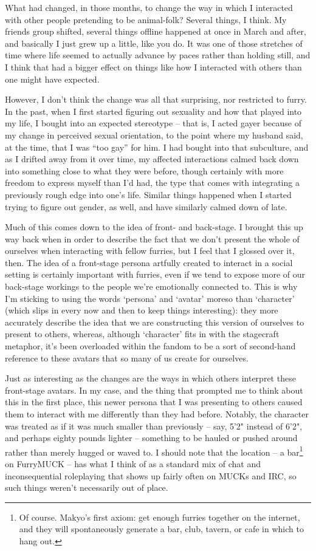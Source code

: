 What had changed, in those months, to change the way in which I interacted with other people pretending to be animal-folk?  Several things, I think.  My friends group shifted, several things offline happened at once in March and after, and basically I just grew up a little, like you do.  It was one of those stretches of time where life seemed to actually advance by paces rather than holding still, and I think that had a bigger effect on things like how I interacted with others than one might have expected.

However, I don't think the change was all that surprising, nor restricted to furry.  In the past, when I first started figuring out sexuality and how that played into my life, I bought into an expected stereotype -- that is, I acted gayer because of my change in perceived sexual orientation, to the point where my husband said, at the time, that I was ``too gay'' for him.  I had bought into that subculture, and as I drifted away from it over time, my affected interactions calmed back down into something close to what they were before, though certainly with more freedom to express myself than I'd had, the type that comes with integrating a previously rough edge into one's life.  Similar things happened when I started trying to figure out gender, as well, and have similarly calmed down of late.

Much of this comes down to the idea of front- and back-stage.  I brought this up way back when in order to describe the fact that we don't present the whole of ourselves when interacting with fellow furries, but I feel that I glossed over it, then.  The idea of a front-stage persona artfully created to interact in a social setting is certainly important with furries, even if we tend to expose more of our back-stage workings to the people we're emotionally connected to.  This is why I'm sticking to using the words `persona' and `avatar' moreso than `character' (which slips in every now and then to keep things interesting): they more accurately describe the idea that we are constructing this version of ourselves to present to others, whereas, although `character' fits in with the stagecraft metaphor, it's been overloaded within the fandom to be a sort of second-hand reference to these avatars that so many of us create for ourselves.

Just as interesting as the changes are the ways in which others interpret these front-stage avatars.  In my case, and the thing that prompted me to think about this in the first place, this newer persona that I was presenting to others caused them to interact with me differently than they had before.  Notably, the character was treated as if it was much smaller than previously -- say, 5'2" instead of 6'2", and perhaps eighty pounds lighter -- something to be hauled or pushed around rather than merely hugged or waved to.  I should note that the location -- a bar\footnote{Of course.  Makyo's first axiom: get enough furries together on the internet, and they will spontaneously generate a bar, club, tavern, or cafe in which to hang out.} on FurryMUCK -- has what I think of as a standard mix of chat and inconsequential roleplaying that shows up fairly often on MUCKs and IRC, so such things weren't necessarily out of place.

